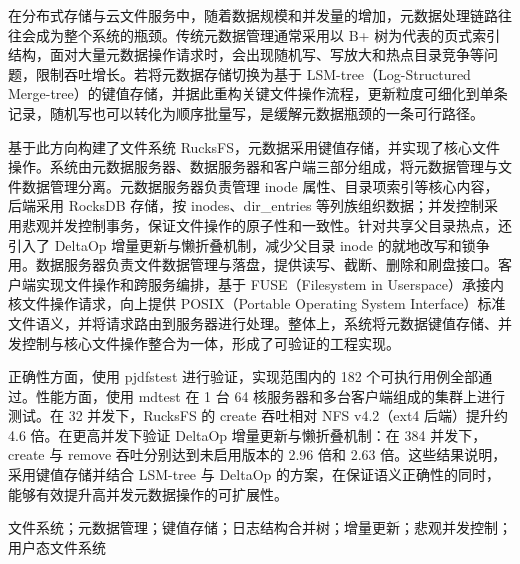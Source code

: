 \abstractch

在分布式存储与云文件服务中，随着数据规模和并发量的增加，元数据处理链路往往会成为整个系统的瓶颈。传统元数据管理通常采用以 B+ 树为代表的页式索引结构，面对大量元数据操作请求时，会出现随机写、写放大和热点目录竞争等问题，限制吞吐增长。若将元数据存储切换为基于 LSM-tree（Log-Structured Merge-tree）的键值存储，并据此重构关键文件操作流程，更新粒度可细化到单条记录，随机写也可以转化为顺序批量写，是缓解元数据瓶颈的一条可行路径。

基于此方向构建了文件系统 RucksFS，元数据采用键值存储，并实现了核心文件操作。系统由元数据服务器、数据服务器和客户端三部分组成，将元数据管理与文件数据管理分离。元数据服务器负责管理 inode 属性、目录项索引等核心内容，后端采用 RocksDB 存储，按 inodes、dir\_entries 等列族组织数据；并发控制采用悲观并发控制事务，保证文件操作的原子性和一致性。针对共享父目录热点，还引入了 DeltaOp 增量更新与懒折叠机制，减少父目录 inode 的就地改写和锁争用。数据服务器负责文件数据管理与落盘，提供读写、截断、删除和刷盘接口。客户端实现文件操作和跨服务编排，基于 FUSE（Filesystem in Userspace）承接内核文件操作请求，向上提供 POSIX（Portable Operating System Interface）标准文件语义，并将请求路由到服务器进行处理。整体上，系统将元数据键值存储、并发控制与核心文件操作整合为一体，形成了可验证的工程实现。

正确性方面，使用 pjdfstest 进行验证，实现范围内的 182 个可执行用例全部通过。性能方面，使用 mdtest 在 1 台 64 核服务器和多台客户端组成的集群上进行测试。在 32 并发下，RucksFS 的 create 吞吐相对 NFS v4.2（ext4 后端）提升约 4.6 倍。在更高并发下验证 DeltaOp 增量更新与懒折叠机制：在 384 并发下，create 与 remove 吞吐分别达到未启用版本的 2.96 倍和 2.63 倍。这些结果说明，采用键值存储并结合 LSM-tree 与 DeltaOp 的方案，在保证语义正确性的同时，能够有效提升高并发元数据操作的可扩展性。

\vspace{5pt}

\keywordsch 文件系统；元数据管理；键值存储；日志结构合并树；增量更新；悲观并发控制；用户态文件系统